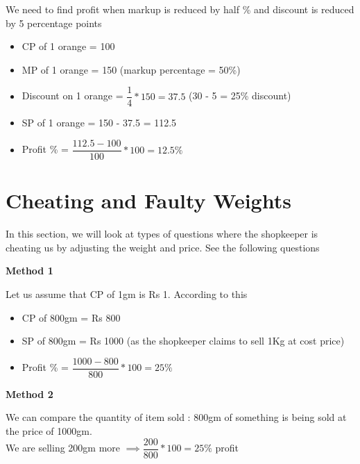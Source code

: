 We need to find profit when markup is reduced by half \% and discount is reduced by 5 percentage points
\begin{itemize}
    \item CP of 1 orange = 100
    \item MP of 1 orange = 150 (markup percentage = 50\%)
    \item Discount on 1 orange = $\dfrac{1}{4} * 150 = 37.5$ (30 - 5 = 25\% discount)
    \item SP of 1 orange = 150 - 37.5 = 112.5
    \item Profit \% = $\dfrac{112.5 - 100}{100} * 100 = 12.5\%$
\end{itemize}
\newpage



















\section{Cheating and Faulty Weights}
In this section, we will look at types of questions where the shopkeeper is cheating us by adjusting the weight and price. See the following questions


\begin{multicols}{2}
    \textbf{Method 1}
    
    Let us assume that CP of 1gm is Rs 1. According to this
    \begin{itemize}
        \item CP of 800gm = Rs 800
        \item SP of 800gm = Rs 1000 (as the shopkeeper claims to sell 1Kg at cost price)
        \item Profit \% = $\dfrac{1000 - 800}{800} * 100 = 25\% $
    \end{itemize}
    
    \columnbreak

    \textbf{Method 2}
    
    We can compare the quantity of item sold : 800gm of something is being sold at the price of 1000gm. \\
    
    We are selling 200gm more $\implies \dfrac{200}{800} * 100 = 25\% $ profit
\end{multicols}

